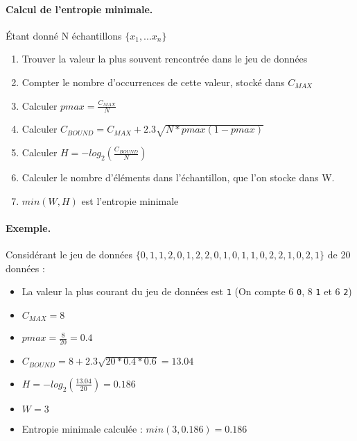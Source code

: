 \paragraph{Calcul de l'entropie minimale.\\}
Étant donné N échantillons $\lbrace x_1, ... x_n \rbrace$
\begin{enumerate}
\item Trouver la valeur la plus souvent rencontrée dans le jeu de données
\item Compter le nombre d’occurrences de cette valeur, stocké dans $C_{MAX}$
\item Calculer  $pmax= \frac{C_{MAX}}{N}$
\item Calculer $C_{BOUND} = C_{MAX} + 2.3 \sqrt{N*pmax(1-pmax)} $
\item Calculer $ H = -log_2(\frac{C_{BOUND}}{N})$
\item Calculer le nombre d'éléments dans l'échantillon, que l'on stocke dans W. 
\item $min(W,H)$ est l'entropie minimale
\end{enumerate}


\paragraph{Exemple.\\}
Considérant le jeu de données  $\lbrace 0,1,1,2,0,1,2,2,0,1,0,1,1,0,2,2,1,0,2,1 \rbrace$ de 20 données :
\begin{itemize}
\item La valeur la plus courant du jeu de données est \texttt{1} (On compte 6 \texttt{0}, 8 \texttt{1} et 6 \texttt{2})
\item $C_{MAX} = 8$
\item $pmax = \frac{8}{20} = 0.4$
\item $ C_{BOUND} = 8 + 2.3 \sqrt{20*0.4*0.6} = 13.04$
\item $ H = -log_2(\frac{13.04}{20}) = 0.186$
\item $ W = 3$
\item Entropie minimale calculée : $ min(3,0.186) = 0.186$
\end{itemize}

